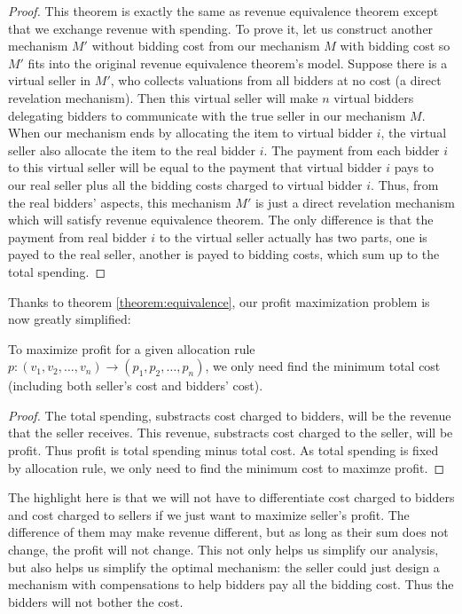 \begin{proof}
This theorem is exactly the same as revenue equivalence theorem except that we
exchange revenue with spending. To prove it, let us construct another mechanism
$M'$ without bidding cost from our mechanism $M$ with bidding cost so $M'$ fits
into the original revenue equivalence theorem's model. Suppose there is a
virtual seller in $M'$, who collects valuations from all bidders at no cost (a
direct revelation mechanism). Then this virtual seller will make $n$ virtual
bidders delegating bidders to communicate with the true seller in our mechanism
$M$.  When our mechanism ends by allocating the item to virtual bidder $i$, the
virtual seller also allocate the item to the real bidder $i$. The payment from
each bidder $i$ to this virtual seller will be equal to the payment that
virtual bidder $i$ pays to our real seller plus all the bidding costs charged
to virtual bidder $i$. Thus, from the real bidders' aspects, this mechanism
$M'$ is just a direct revelation mechanism which will satisfy revenue
equivalence theorem. The only difference is that the payment from real bidder
$i$ to the virtual seller actually has two parts, one is payed to the real
seller, another is payed to bidding costs, which sum up to the total spending.
\end{proof}

Thanks to theorem \ref{theorem:equivalence}, our profit maximization problem
is now greatly simplified: 

\begin{corollary}
To maximize profit for a given allocation rule $p: (v_1, v_2, \ldots, v_n)
\rightarrow (p_1, p_2, \ldots, p_n)$, we only need find the minimum total cost
(including both seller's cost and bidders' cost).
\end{corollary}

\begin{proof}
The total spending, substracts cost charged to bidders, will be the revenue
that the seller receives.  This revenue, substracts cost charged to the seller,
will be profit. Thus profit is total spending minus total cost. As total
spending is fixed by allocation rule, we only need to find the minimum cost to
maximze profit.
\end{proof}

The highlight here is that we will not have to differentiate cost charged to
bidders and cost charged to sellers if we just want to maximize seller's profit.
The difference of them may make revenue different, but as long as their sum
does not change, the profit will not change. This not only helps us simplify our
analysis, but also helps us simplify the optimal mechanism: the seller could
just design a mechanism with compensations to help bidders pay all the bidding
cost. Thus the bidders will not bother the cost.

